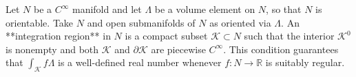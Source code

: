 Let $N$ be a $C^\infty$ manifold and let $\Lambda$ be a volume element on $N$, so that $N$ is orientable. Take $N$ and open submanifolds of $N$ as oriented via $\Lambda$. An **integration region** in $N$ is a compact subset $\mathcal{K} \subset N$ such that the interior $\mathcal{K}^0$ is nonempty and both $\mathcal{K}$ and $\partial\mathcal{K}$ are piecewise $C^\infty$. This condition guarantees that $\int_{\mathcal{K}} f\Lambda$ is a well-defined real number whenever $f: N \to \mathbb{R}$ is suitably regular.
